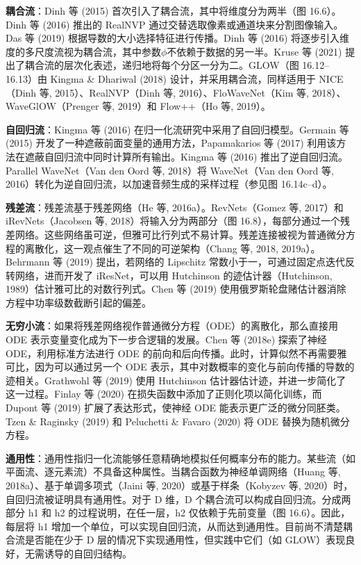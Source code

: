 \textbf{耦合流}：Dinh 等 (2015) 首次引入了耦合流，其中将维度分为两半（图 16.6）。Dinh 等 (2016) 推出的 RealNVP 通过交替选取像素或通道块来分割图像输入。Das 等 (2019) 根据导数的大小选择特征进行传播。Dinh 等 (2016) 将逐步引入维度的多尺度流视为耦合流，其中参数\(\phi\)不依赖于数据的另一半。Kruse 等 (2021) 提出了耦合流的层次化表述，递归地将每个分区一分为二。GLOW（图 16.12–16.13）由 Kingma \& Dhariwal (2018) 设计，并采用耦合流，同样适用于 NICE（Dinh 等, 2015）、RealNVP（Dinh 等, 2016）、FloWaveNet（Kim 等, 2018）、WaveGlOW（Prenger 等, 2019）和 Flow++（Ho 等, 2019）。

\textbf{自回归流}：Kingma 等 (2016) 在归一化流研究中采用了自回归模型。Germain 等 (2015) 开发了一种遮蔽前面变量的通用方法，Papamakarios 等 (2017) 利用该方法在遮蔽自回归流中同时计算所有输出。Kingma 等 (2016) 推出了逆自回归流。Parallel WaveNet（Van den Oord 等, 2018）将 WaveNet（Van den Oord 等, 2016）转化为逆自回归流，以加速音频生成的采样过程（参见图 16.14c–d）。

\textbf{残差流}：残差流基于残差网络（He 等, 2016a）。RevNets（Gomez 等, 2017）和 iRevNets（Jacobsen 等, 2018）将输入分为两部分（图 16.8），每部分通过一个残差网络。这些网络虽可逆，但雅可比行列式不易计算。残差连接被视为普通微分方程的离散化，这一观点催生了不同的可逆架构（Chang 等, 2018, 2019a）。Behrmann 等 (2019) 提出，若网络的 Lipschitz 常数小于一，可通过固定点迭代反转网络，进而开发了 iResNet，可以用 Hutchinson 的迹估计器（Hutchinson, 1989）估计雅可比的对数行列式。Chen 等 (2019) 使用俄罗斯轮盘赌估计器消除方程中功率级数截断引起的偏差。

\textbf{无穷小流}：如果将残差网络视作普通微分方程（ODE）的离散化，那么直接用 ODE 表示变量变化成为下一步合逻辑的发展。Chen 等 (2018e) 探索了神经 ODE，利用标准方法进行 ODE 的前向和后向传播。此时，计算似然不再需要雅可比，因为可以通过另一个 ODE 表示，其中对数概率的变化与前向传播的导数的迹相关。Grathwohl 等 (2019) 使用 Hutchinson 估计器估计迹，并进一步简化了这一过程。Finlay 等 (2020) 在损失函数中添加了正则化项以简化训练，而 Dupont 等 (2019) 扩展了表达形式，使神经 ODE 能表示更广泛的微分同胚类。Tzen \& Raginsky (2019) 和 Peluchetti \& Favaro (2020) 将 ODE 替换为随机微分方程。

\textbf{通用性}：通用性指归一化流能够任意精确地模拟任何概率分布的能力。某些流（如平面流、逐元素流）不具备这种属性。当耦合函数为神经单调网络（Huang 等, 2018a）、基于单调多项式（Jaini 等, 2020）或基于样条（Kobyzev 等, 2020）时，自回归流被证明具有通用性。对于 D 维，D 个耦合流可以构成自回归流。分成两部分 h1 和 h2 的过程说明，在任一层，h2 仅依赖于先前变量（图 16.6）。因此，每层将 h1 增加一个单位，可以实现自回归流，从而达到通用性。目前尚不清楚耦合流是否能在少于 D 层的情况下实现通用性，但实践中它们（如 GLOW）表现良好，无需诱导的自回归结构。

